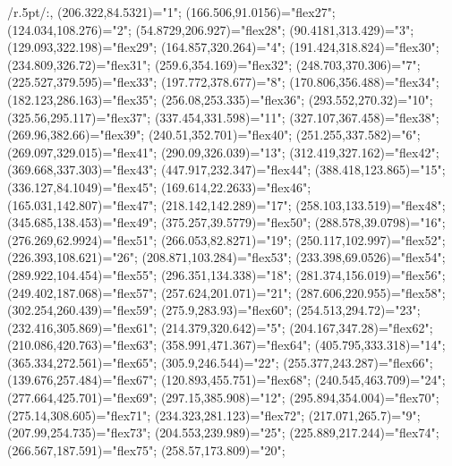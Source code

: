 
\xy /r.5pt/:,
(206.322,84.5321)="1";
(166.506,91.0156)="flex27"; %
(124.034,108.276)="2";
(54.8729,206.927)="flex28"; %
(90.4181,313.429)="3";
(129.093,322.198)="flex29"; %
(164.857,320.264)="4";
(191.424,318.824)="flex30"; %
(234.809,326.72)="flex31"; %
(259.6,354.169)="flex32"; %
(248.703,370.306)="7";
(225.527,379.595)="flex33"; %
(197.772,378.677)="8";
(170.806,356.488)="flex34"; %
(182.123,286.163)="flex35"; %
(256.08,253.335)="flex36"; %
(293.552,270.32)="10";
(325.56,295.117)="flex37"; %
(337.454,331.598)="11";
(327.107,367.458)="flex38"; %
(269.96,382.66)="flex39"; %
(240.51,352.701)="flex40"; %
(251.255,337.582)="6";
(269.097,329.015)="flex41"; %
(290.09,326.039)="13";
(312.419,327.162)="flex42"; %
(369.668,337.303)="flex43"; %
(447.917,232.347)="flex44"; %
(388.418,123.865)="15";
(336.127,84.1049)="flex45"; %
(169.614,22.2633)="flex46"; %
(165.031,142.807)="flex47"; %
(218.142,142.289)="17";
(258.103,133.519)="flex48"; %
(345.685,138.453)="flex49"; %
(375.257,39.5779)="flex50"; %
(288.578,39.0798)="16";
(276.269,62.9924)="flex51"; %
(266.053,82.8271)="19";
(250.117,102.997)="flex52"; %
(226.393,108.621)="26";
(208.871,103.284)="flex53"; %
(233.398,69.0526)="flex54"; %
(289.922,104.454)="flex55"; %
(296.351,134.338)="18";
(281.374,156.019)="flex56"; %
(249.402,187.068)="flex57"; %
(257.624,201.071)="21";
(287.606,220.955)="flex58"; %
(302.254,260.439)="flex59"; %
(275.9,283.93)="flex60"; %
(254.513,294.72)="23";
(232.416,305.869)="flex61"; %
(214.379,320.642)="5";
(204.167,347.28)="flex62"; %
(210.086,420.763)="flex63"; %
(358.991,471.367)="flex64"; %
(405.795,333.318)="14";
(365.334,272.561)="flex65"; %
(305.9,246.544)="22";
(255.377,243.287)="flex66"; %
(139.676,257.484)="flex67"; %
(120.893,455.751)="flex68"; %
(240.545,463.709)="24";
(277.664,425.701)="flex69"; %
(297.15,385.908)="12";
(295.894,354.004)="flex70"; %
(275.14,308.605)="flex71"; %
(234.323,281.123)="flex72"; %
(217.071,265.7)="9";
(207.99,254.735)="flex73"; %
(204.553,239.989)="25";
(225.889,217.244)="flex74"; %
(266.567,187.591)="flex75"; %
(258.57,173.809)="20";
